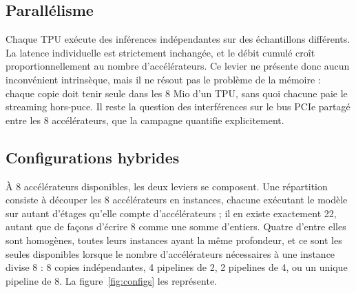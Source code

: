 \documentclass[11pt,a4paper]{report}
\begin{document}
\subsection{Parallélisme}

Chaque TPU exécute des inférences indépendantes sur des échantillons différents. La latence individuelle est strictement inchangée, et le débit cumulé croît proportionnellement au nombre d'accélérateurs. Ce levier ne présente donc aucun inconvénient intrinsèque, mais il ne résout pas le problème de la mémoire : chaque copie doit tenir seule dans les 8 Mio d'un TPU, sans quoi chacune paie le streaming hors-puce. Il reste la question des interférences sur le bus PCIe partagé entre les 8 accélérateurs, que la campagne quantifie explicitement.

\subsection{Configurations hybrides}

À 8 accélérateurs disponibles, les deux leviers se composent. Une répartition consiste à découper les 8 accélérateurs en instances, chacune exécutant le modèle sur autant d'étages qu'elle compte d'accélérateurs ; il en existe exactement 22, autant que de façons d'écrire 8 comme une somme d'entiers. Quatre d'entre elles sont homogènes, toutes leurs instances ayant la même profondeur, et ce sont les seules disponibles lorsque le nombre d'accélérateurs nécessaires à une instance divise 8 : 8 copies indépendantes, 4 pipelines de 2, 2 pipelines de 4, ou un unique pipeline de 8. La figure~\ref{fig:configs} les représente.
\end{document}
